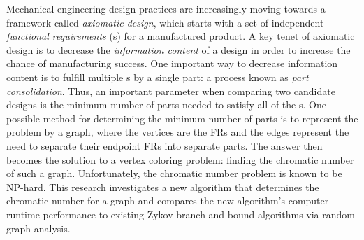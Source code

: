 Mechanical engineering design practices are increasingly moving towards a framework called \emph{axiomatic design},
which starts with a set of independent \emph{functional requirements} ({\FR}s) for a manufactured product.  A key
tenet of axiomatic design is to decrease the \emph{information content} of a design in order to increase the chance
of manufacturing success.  One important way to decrease information content is to fulfill multiple {\FR}s by a
single part: a process known as \emph{part consolidation}.  Thus, an important parameter when comparing two
candidate designs is the minimum number of parts needed to satisfy all of the {\FR}s.  One possible method for
determining the minimum number of parts is to represent the problem by a graph, where the vertices are the FRs and
the edges represent the need to separate their endpoint FRs into separate parts.  The answer then becomes the
solution to a vertex coloring problem: finding the chromatic number of such a graph.  Unfortunately, the chromatic
number problem is known to be NP-hard.  This research investigates a new algorithm that determines the chromatic
number for a graph and compares the new algorithm's computer runtime performance to existing Zykov branch
and bound algorithms via random graph analysis.  

